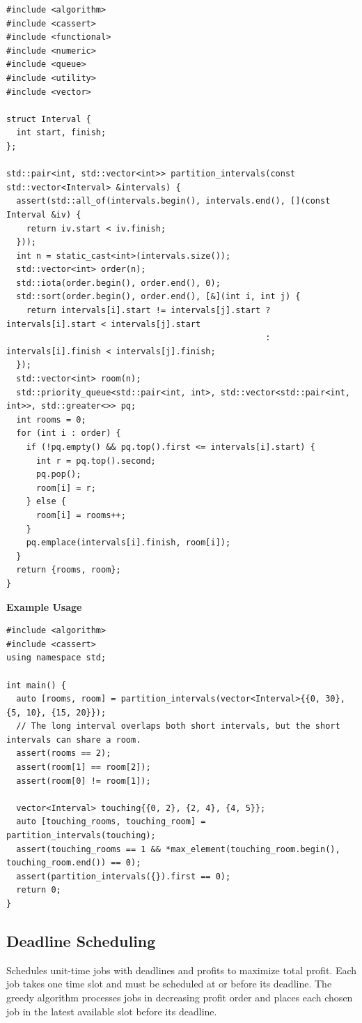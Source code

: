 \begin{lstlisting}[style=cpp]
#include <algorithm>
#include <cassert>
#include <functional>
#include <numeric>
#include <queue>
#include <utility>
#include <vector>

struct Interval {
  int start, finish;
};

std::pair<int, std::vector<int>> partition_intervals(const std::vector<Interval> &intervals) {
  assert(std::all_of(intervals.begin(), intervals.end(), [](const Interval &iv) {
    return iv.start < iv.finish;
  }));
  int n = static_cast<int>(intervals.size());
  std::vector<int> order(n);
  std::iota(order.begin(), order.end(), 0);
  std::sort(order.begin(), order.end(), [&](int i, int j) {
    return intervals[i].start != intervals[j].start ? intervals[i].start < intervals[j].start
                                                    : intervals[i].finish < intervals[j].finish;
  });
  std::vector<int> room(n);
  std::priority_queue<std::pair<int, int>, std::vector<std::pair<int, int>>, std::greater<>> pq;
  int rooms = 0;
  for (int i : order) {
    if (!pq.empty() && pq.top().first <= intervals[i].start) {
      int r = pq.top().second;
      pq.pop();
      room[i] = r;
    } else {
      room[i] = rooms++;
    }
    pq.emplace(intervals[i].finish, room[i]);
  }
  return {rooms, room};
}
\end{lstlisting}
\textbf{Example Usage}\par
\begin{lstlisting}[style=cpp]
#include <algorithm>
#include <cassert>
using namespace std;

int main() {
  auto [rooms, room] = partition_intervals(vector<Interval>{{0, 30}, {5, 10}, {15, 20}});
  // The long interval overlaps both short intervals, but the short intervals can share a room.
  assert(rooms == 2);
  assert(room[1] == room[2]);
  assert(room[0] != room[1]);

  vector<Interval> touching{{0, 2}, {2, 4}, {4, 5}};
  auto [touching_rooms, touching_room] = partition_intervals(touching);
  assert(touching_rooms == 1 && *max_element(touching_room.begin(), touching_room.end()) == 0);
  assert(partition_intervals({}).first == 0);
  return 0;
}
\end{lstlisting}
\subsection{Deadline Scheduling}
\label{sec:1.5.6}
Schedules unit-time jobs with deadlines and profits to maximize total profit. Each job takes one time slot and must be scheduled at or before its deadline. The greedy algorithm processes jobs in decreasing profit order and places each chosen job in the latest available slot before its deadline.

